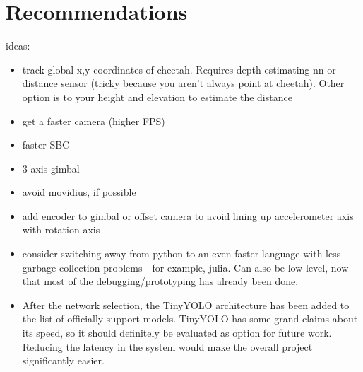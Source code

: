 \chapter{Recommendations}

ideas:
\begin{itemize}
	\item track global x,y coordinates of cheetah. Requires depth estimating nn or distance sensor (tricky because you aren't always point at cheetah). Other option is to your height and elevation to estimate the distance
	\item get a faster camera (higher FPS)
	\item faster SBC
	\item 3-axis gimbal
	\item avoid movidius, if possible
	\item add encoder to gimbal or offset camera to avoid lining up accelerometer axis with rotation axis
	\item consider switching away from python to an even faster language with less garbage collection problems - for example, julia. Can also be low-level, now that most of the debugging/prototyping has already been done.
	\item After the network selection, the TinyYOLO architecture has been added to the list of officially support models. TinyYOLO has some grand claims about its speed, so it should definitely be evaluated as option for future work. Reducing the latency in the system would make the overall project significantly easier.
\end{itemize}

